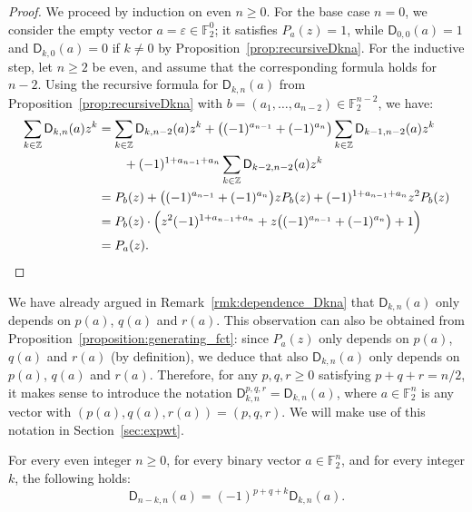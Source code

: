 \documentclass[runningheads,orivec]{llncs}
\newcommand{\Dkna}[3]{\mathsf{D}_{#2,#1}(a)}
\newcommand{\F}{\mathbb{F}}
\newcommand{\Z}{\mathbb{Z}}
\let\geq=\geqslant
\begin{document}
    \begin{proof}
    	We proceed by induction on even $n\geq 0$. 
    	For the base case $n=0$, we consider the empty vector $a=\varepsilon\in\F_2^0$; it satisfies $P_a(z)=1$, while $\Dkna 00a=1$ and $\Dkna 0ka=0$ if $k\neq 0$ by Proposition~\ref{prop:recursiveDkna}. For the inductive step, let $n\geq 2$ be even, and assume that the corresponding formula holds for $n-2$. Using the recursive formula for $\Dkna nka$ from Proposition~\ref{prop:recursiveDkna} with $b=(a_1,\dots,a_{n-2})\in\F_2^{n-2}$, we have:
    	\begin{align*}
    	\begin{split}
    		\sum_{k\in\Z}\Dkna nka z^k&=\sum_{k\in\Z}\Dkna{n-2}kbz^k+\big((-1)^{a_{n-1}}+(-1)^{a_{n}}\big)\sum_{k\in\Z}\Dkna{n-2}{k-1}{b}z^k\\
    		&\qquad+(-1)^{1+a_{n-1}+a_n}\sum_{k\in\Z}\Dkna{n-2}{k-2}{b}z^k\\
    		&=P_b(z)+\big((-1)^{a_{n-1}}+(-1)^{a_{n}}\big)zP_b(z)+(-1)^{1+a_{n-1}+a_n}z^2P_b(z)\\
    		&=P_b(z)\cdot\Big(z^2(-1)^{1+a_{n-1}+a_n}+z\big((-1)^{a_{n-1}}+(-1)^{a_{n}}\big)+1\Big)\\
    		&=P_a(z).\qedhere
    	\end{split}
    	\end{align*}
    \end{proof}
    
    \begin{remark}\label{rmk:Dkna_dep_pqr}
        We have already argued in Remark~\ref{rmk:dependence_Dkna} that $\Dkna nka$ only depends on $p(a)$, $q(a)$ and $r(a)$. This observation can also be obtained from Proposition~\ref{proposition:generating_fct}: since $P_a(z)$ only depends on $p(a)$, $q(a)$ and $r(a)$ (by definition), we deduce that also $\Dkna nka$ only depends on $p(a)$, $q(a)$ and $r(a)$. Therefore, for any $p,q,r\geq0$ satisfying $p+q+r=n/2$, it makes sense to introduce the notation $\mathsf D_{k,n}^{p,q,r}=\Dkna nka$, where $a\in\mathbb F_2^n$ is any vector with $(p(a),q(a),r(a))=(p,q,r)$. We will make use of this notation in Section~\ref{sec:expwt}.
    \end{remark}
    
    \begin{proposition}\label{proposition:symmetry}
    	For every even integer $n\geq 0$, for every binary vector $a\in\F_2^n$, and for every integer $k$, the following holds:
    	\[
    		\Dkna n{n-k}a=(-1)^{p+q+k}\Dkna nka.
    	\]
    \end{proposition}
    
\end{document}
